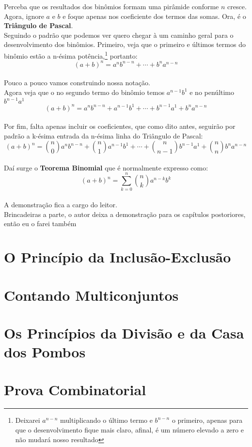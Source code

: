 \documentclass[a4paper,11pt]{book}
\theoremstyle{definition}
\theoremstyle{break}
\begin{document}
Perceba que os resultados dos binômios formam uma pirâmide conforme $n$ cresce. Agora, ignore $a$ e $b$ e foque apenas nos coeficiente dos termos das somas. Ora, é o \textbf{Triângulo de Pascal}.
\\
Seguindo o padrão que podemos ver quero chegar à um caminho geral para o desenvolvimento dos binômios. Primeiro, veja que o primeiro e últimos termos do binômio estão a n-ésima potência,\footnote{Deixarei $a^{n-n}$ multiplicando o último termo e $b^{n-n}$ o primeiro, apenas para que o desenvolvimento fique mais claro, afinal, é um número elevado a zero e não mudará nosso resultado} portanto:
$$(a+b)^n = a^nb^{n-n} + \cdots + b^na^{n-n} $$
\\
Pouco a pouco vamos construindo nossa notação.
\\
Agora veja que o no segundo termo do binômio temos $a^{n-1}b^1$ e no penúltimo $b^{n-1}a^1$
\\
$$(a+b)^n = a^nb^{n-n} + a^{n-1}b^1 + \cdots + b^{n-1}a^1 + b^na^{n-n} $$
\\
Por fim, falta apenas incluir os coeficientes, que como dito antes, seguirão por padrão a k-ésima entrada da n-ésima linha do Triângulo de Pascal:
\\
$$(a+b)^n = {n \choose 0}a^nb^{n-n} + {n \choose 1}a^{n-1}b^1 + \cdots + {n \choose n-1}b^{n-1}a^1 + {n \choose n}b^na^{n-n} $$
\\
Daí surge o \textbf{Teorema Binomial} que é normalmente expresso como:
\\
$$(a+b)^n = \sum\limits_{k=0}^n {n \choose k}a^{n-k}b^k$$
\\
A demonstração fica a cargo do leitor.
\\
Brincadeiras a parte, o autor deixa a demonstração para os capítulos postoriores, então eu o farei também
\section{O Princípio da Inclusão-Exclusão}
\section{Contando Multiconjuntos}
\section{Os Princípios da Divisão e da Casa dos Pombos}
\section{Prova Combinatorial}
\end{document}
